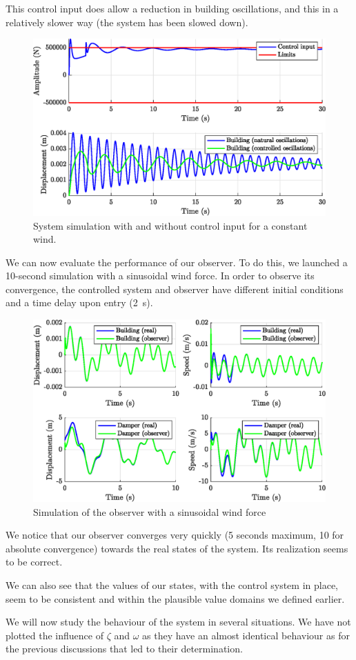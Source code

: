 This control input does allow a reduction in building oscillations, and this in a relatively slower way (the system has been slowed down).
\begin{figure}[H]
    \centering
    \includegraphics[width=\textwidth]{resources/eps/3_constant.eps}
    \caption{System simulation with and without control input for a constant wind.}
    \label{fig:3.controller}
\end{figure}
We can now evaluate the performance of our observer. To do this, we launched a 10-second simulation with a sinusoidal wind force. In order to observe its convergence, the controlled system and observer have different initial conditions and a time delay upon entry (\SI{2}{\second}).
\begin{figure}[H]
    \centering
    \includegraphics[width=\textwidth]{resources/eps/3_observer.eps}
    \caption{Simulation of the observer with a sinusoidal wind force}
\end{figure}
We notice that our observer converges very quickly (5 seconds maximum, 10 for absolute convergence) towards the real states of the system. Its realization seems to be correct.\par
We can also see that the values of our states, with the control system in place, seem to be consistent and within the plausible value domains we defined earlier.\par
We will now study the behaviour of the system in several situations. We have not plotted the influence of $\zeta$ and $\omega$ as they have an almost identical behaviour as for the previous discussions that led to their determination.

